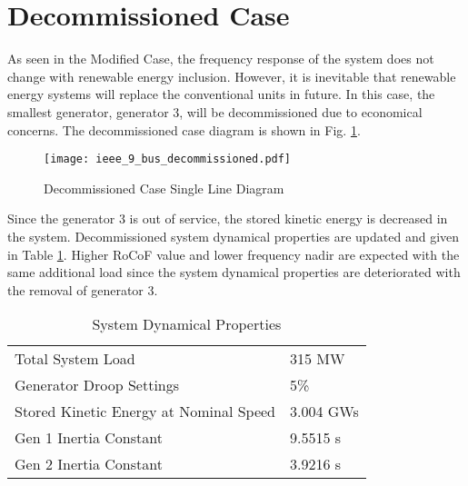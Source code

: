 \section{Decommissioned Case}
\label{sec:kdecommissioned}
As seen in the Modified Case, the frequency response of the system does not change with renewable energy inclusion. However, it is inevitable that renewable energy systems will replace the conventional units in future. In this case, the smallest generator, generator 3, will be decommissioned due to economical concerns. The decommissioned case diagram is shown in Fig. \ref{decommissioned_case}.\par
\begin{figure}[h!]
	\centering
	\texttt{[image: ieee\_9\_bus\_decommissioned.pdf]}
	\caption{Decommissioned Case Single Line Diagram}
	\label{decommissioned_case}
\end{figure}
Since the generator 3 is out of service, the stored kinetic energy is decreased in the system. Decommissioned system dynamical properties are updated and given in Table \ref{systemdynamicaldatacase3}. Higher RoCoF value and lower frequency nadir are expected with the same additional load since the system dynamical properties are deteriorated with the removal of generator 3.
\begin{table}[h]
	\centering
	\begin{tabular}{ll}
		\hline
		Total System Load                      & 315 MW    \\
		Generator Droop Settings               & 5\%       \\
		Stored Kinetic Energy at Nominal Speed & 3.004 GWs \\
		Gen 1 Inertia Constant                 & 9.5515 s  \\
		Gen 2 Inertia Constant                 & 3.9216 s  \\
		\hline
	\end{tabular}
	\caption{System Dynamical Properties}
	\label{systemdynamicaldatacase3}
\end{table}
